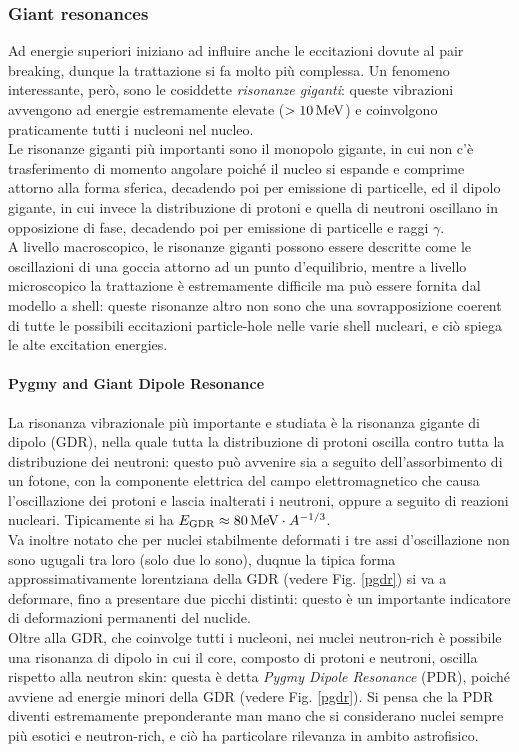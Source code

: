 \subsubsection{Giant resonances}
\label{sub-giant-res}

Ad energie superiori iniziano ad influire anche le eccitazioni dovute al pair breaking, dunque la trattazione si fa molto più complessa. Un fenomeno interessante, però, sono le cosiddette \textit{risonanze giganti}: queste vibrazioni avvengono ad energie estremamente elevate ($ > 10\,\mathrm{MeV} $) e coinvolgono praticamente tutti i nucleoni nel nucleo.\\
Le risonanze giganti più importanti sono il monopolo gigante, in cui non c'è trasferimento di momento angolare poiché il nucleo si espande e comprime attorno alla forma sferica, decadendo poi per emissione di particelle, ed il dipolo gigante, in cui invece la distribuzione di protoni e quella di neutroni oscillano in opposizione di fase, decadendo poi per emissione di particelle e raggi $ \gamma $.\\
A livello macroscopico, le risonanze giganti possono essere descritte come le oscillazioni di una goccia attorno ad un punto d'equilibrio, mentre a livello microscopico la trattazione è estremamente difficile ma può essere fornita dal modello a shell: queste risonanze altro non sono che una sovrapposizione coerent di tutte le possibili eccitazioni particle-hole nelle varie shell nucleari, e ciò spiega le alte excitation energies.

\paragraph{Pygmy and Giant Dipole Resonance}

La risonanza vibrazionale più importante e studiata è la risonanza gigante di dipolo (GDR), nella quale tutta la distribuzione di protoni oscilla contro tutta la distribuzione dei neutroni: questo può avvenire sia a seguito dell'assorbimento di un fotone, con la componente elettrica del campo elettromagnetico che causa l'oscillazione dei protoni e lascia inalterati i neutroni, oppure a seguito di reazioni nucleari. Tipicamente si ha $ E_{\text{GDR}} \approx 80\,\mathrm{MeV} \cdot A^{-1/3} $.\\
Va inoltre notato che per nuclei stabilmente deformati i tre assi d'oscillazione non sono ugugali tra loro (solo due lo sono), duqnue la tipica forma approssimativamente lorentziana della GDR (vedere Fig. \ref{pgdr}) si va a deformare, fino a presentare due picchi distinti: questo è un importante indicatore di deformazioni permanenti del nuclide.\\
Oltre alla GDR, che coinvolge tutti i nucleoni, nei nuclei neutron-rich è possibile una risonanza di dipolo in cui il core, composto di protoni e neutroni, oscilla rispetto alla neutron skin: questa è detta \textit{Pygmy Dipole Resonance} (PDR), poiché avviene ad energie minori della GDR (vedere Fig. \ref{pgdr}). Si pensa che la PDR diventi estremamente preponderante man mano che si considerano nuclei sempre più esotici e neutron-rich, e ciò ha particolare rilevanza in ambito astrofisico.

